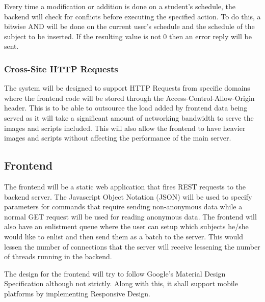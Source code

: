 \documentclass{sigchi}
\begin{document}
Every time a modification or addition is done on a student's schedule, the 
backend will check for conflicts before executing the specified action. 
To do this, a bitwise AND will be done on the current user's schedule and the
schedule of the subject to be inserted. If the resulting value is not 0 then
an error reply will be sent.

\subsubsection{Cross-Site HTTP Requests}

The system will be designed to support HTTP Requests from specific domains
where the frontend code will be stored through the Access-Control-Allow-Origin header. 
This is to be able to outsource the load added by frontend data being served as 
it will take a significant amount of networking bandwidth to serve the images and
scripts included. This will also allow the frontend to have heavier images and 
scripts without affecting the performance of the main server.


\subsection{Frontend}

The frontend will be a static web application that fires REST requests to the
backend server. The Javascript Object Notation (JSON) will be used to specify parameters
for commands that require sending non-anonymous data while a normal GET request
will be used for reading anonymous data. The frontend will also have an enlistment queue
where the user can setup which subjects he/she would like to enlist and then
send them as a batch to the server. This would lessen the number of connections
that the server will receive lessening the number of threads running in the 
backend.

The design for the frontend will try to follow Google's Material Design 
Specification although not strictly. Along with this, it shall support mobile
platforms by implementing Responsive Design. 



% 
% 

\end{document}
